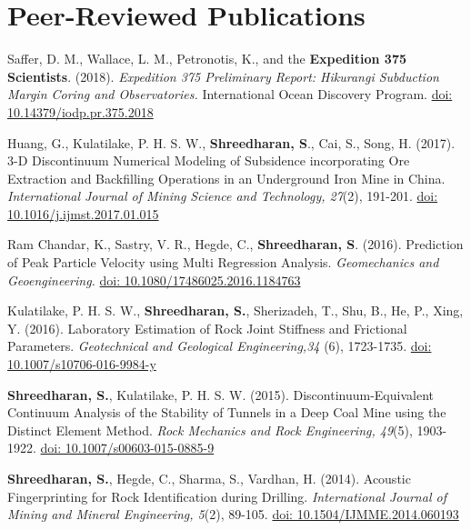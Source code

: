 \documentclass[11pt,letterpaper]{article}
\begin{document}
\section*{Peer-Reviewed Publications}
\begin{etaremune}
    \item Saffer, D. M., Wallace, L. M., Petronotis, K., and the {\bf Expedition 375 Scientists}. (2018). {\em Expedition 375 Preliminary Report: Hikurangi Subduction Margin Coring and Observatories.} International Ocean Discovery Program. \href{https://doi.org/10.14379/iodp.pr.375.2018}{doi: 10.14379/iodp.pr.375.2018}
    \item Huang, G., Kulatilake, P. H. S. W., {\bf Shreedharan, S}., Cai, S., Song, H. (2017). 3-D Discontinuum Numerical Modeling of Subsidence incorporating Ore Extraction and Backfilling Operations in an Underground Iron Mine in China. {\em International Journal of Mining Science and Technology, 27}(2), 191-201. \href{http://www.sciencedirect.com/science/article/pii/S2095268617300617}{doi: 10.1016/j.ijmst.2017.01.015}
    \item Ram Chandar, K., Sastry, V. R., Hegde, C., {\bf Shreedharan, S}. (2016). Prediction of Peak Particle Velocity using Multi Regression Analysis. {\em Geomechanics and Geoengineering. }\href{http://www.tandfonline.com/doi/abs/10.1080/17486025.2016.1184763}{doi: 10.1080/17486025.2016.1184763} 
    \item Kulatilake, P. H. S. W., {\bf Shreedharan, S.}, Sherizadeh, T., Shu, B., He, P., Xing, Y. (2016). Laboratory Estimation of Rock Joint Stiffness and Frictional Parameters. {\em Geotechnical and Geological Engineering,34 }(6), 1723-1735. \href{http://link.springer.com/article/10.1007/s10706-016-9984-y}{doi: 10.1007/s10706-016-9984-y}
    \item {\bf Shreedharan, S.}, Kulatilake, P. H. S. W. (2015). Discontinuum-Equivalent Continuum Analysis of the Stability of Tunnels in a Deep Coal Mine using the Distinct Element Method. {\em Rock Mechanics and Rock Engineering, 49}(5), 1903-1922. \href{http://link.springer.com/article/10.1007/s00603-015-0885-9}{doi: 10.1007/s00603-015-0885-9}
    \item {\bf Shreedharan, S.}, Hegde, C., Sharma, S., Vardhan, H. (2014). Acoustic Fingerprinting for Rock Identification during Drilling. {\em International Journal of Mining and Mineral Engineering, 5}(2), 89-105. \href{http://www.inderscienceonline.com/doi/abs/10.1504/IJMME.2014.060193}{doi: 10.1504/IJMME.2014.060193}
\end{etaremune}
\end{document}
